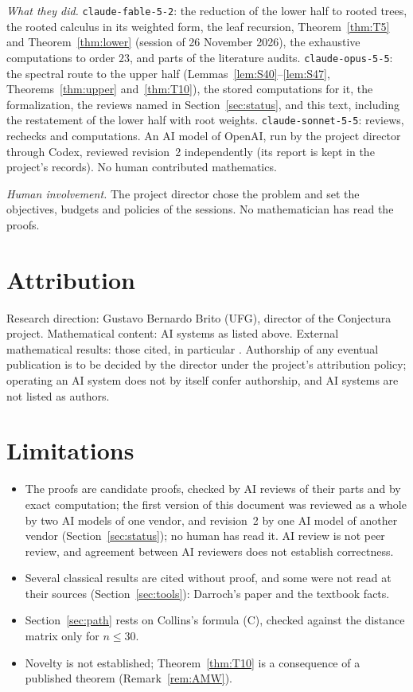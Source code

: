\documentclass[11pt]{amsart}
\theoremstyle{definition}
\theoremstyle{remark}
\begin{document}
\emph{What they did.} \nolinkurl{claude-fable-5-2}: the reduction of the lower
half to rooted trees, the rooted calculus in its weighted form, the leaf
recursion, Theorem~\ref{thm:T5} and Theorem~\ref{thm:lower} (session of
26 November 2026), the exhaustive computations to order $23$, and parts of
the literature audits. \nolinkurl{claude-opus-5-5}: the spectral route to the
upper half (Lemmas~\ref{lem:S40}--\ref{lem:S47}, Theorems~\ref{thm:upper}
and~\ref{thm:T10}), the stored computations for it, the formalization, the
reviews named in Section~\ref{sec:status}, and this text, including the
restatement of the lower half with root weights. \nolinkurl{claude-sonnet-5-5}:
reviews, rechecks and computations. An AI model of OpenAI, run by the
project director through Codex, reviewed revision~2 independently (its
report is kept in the project's records). No human contributed mathematics.

\emph{Human involvement.} The project director chose the problem and set the
objectives, budgets and policies of the sessions. No mathematician has read
the proofs.

\section*{Attribution}

Research direction: Gustavo Bernardo Brito (UFG), director of the Conjectura
project. Mathematical content: AI systems as listed above. External
mathematical results: those cited, in particular
\cite{GL78,GP71,AAB,Col89,Dar64,Pit97,Mer90,AMW}. Authorship of any eventual
publication is to be decided by the director under the project's
attribution policy; operating an AI system does not by itself confer
authorship, and AI systems are not listed as authors.

\section*{Limitations}

\begin{itemize}
\item The proofs are candidate proofs, checked by AI reviews of their parts
and by exact computation; the first version of this document was reviewed
as a whole by two AI models of one vendor, and revision~2 by one AI model of
another vendor (Section~\ref{sec:status}); no human has read it. AI review
is not peer review, and agreement between AI reviewers does not establish
correctness.
\item Several classical results are cited without proof, and some were not
read at their sources (Section~\ref{sec:tools}): Darroch's paper and the
textbook facts.
\item Section~\ref{sec:path} rests on Collins's formula (C), checked against
the distance matrix only for $n\le30$.
\item Novelty is not established; Theorem~\ref{thm:T10} is a consequence
of a published theorem (Remark~\ref{rem:AMW}).
\end{itemize}
\end{document}

